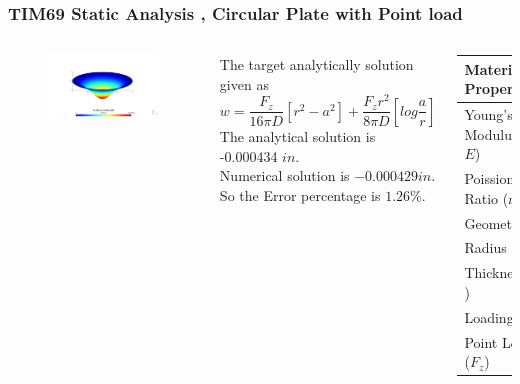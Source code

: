 \documentclass[9pt]{beamer}
\begin{document}
\begin{frame}
\frametitle{TIM69 Static Analysis , Circular Plate with Point load}

\begin{columns}

\begin{figure}[h!]
\centering
{}%
  \includegraphics[width=\linewidth,trim={5cm 4cm 5cm 4cm},clip]{TIM69_pos.png}
\endminipage
\end{figure}
The target analytically solution given as
\begin{equation}
w = \frac{F_z}{16 \pi D}\left[ r^2 - a^2 \right]+\frac{F_zr^2}{8 \pi D}\left[ log \frac{a}{r} \right]
\end{equation} 
 The analytical solution is -0.000434 $in$.\\ Numerical solution is $ -0.000429 in $. \\
So the Error percentage is $ 1.26 \% $. 

\begin{table}[ht]
\renewcommand{\arraystretch}{1.5}
\centering
\begin{tabular}{ll}
\hline
\multicolumn{2}{l}{Material Property} \\ \hline  \hline
Young's Modulus ($E$)          & 5E11 $Pa$        \\
Poission's Ratio ($\nu$)       & 0.3            \\ 
    \hline
    \multicolumn{2}{l}{Geometric Data} \\ \hline  \hline
            Radius ($r$)        & 1 $m$   \\
            Thickness($t$)     &         0.01 $m$  \\
             \hline
    \multicolumn{2}{l}{Loading Data} \\ \hline  \hline
    Point Load ($F_z$)        & -1000 $N$     \\    \hline
\end{tabular}
\end{table}


\end{columns}
\end{frame}
\end{document}
